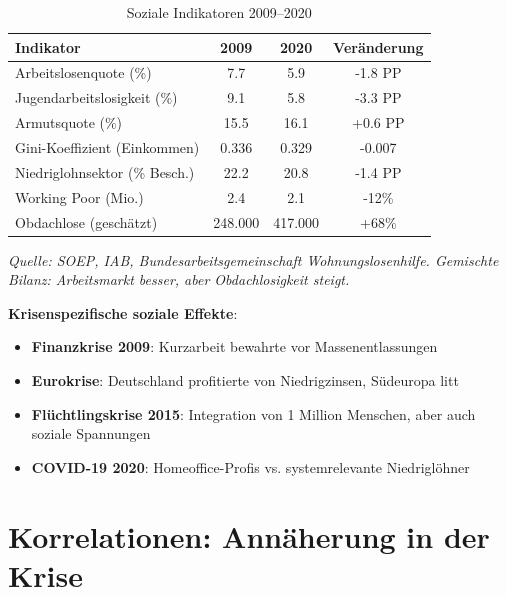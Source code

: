 \begin{table}[ht]
    \centering
    \caption{Soziale Indikatoren 2009–2020}
    \label{tab:sozial_krisen}
    \begin{tabular}{lccc}
        \toprule
        \textbf{Indikator} & \textbf{2009} & \textbf{2020} & \textbf{Veränderung} \\
        \midrule
        Arbeitslosenquote (\%) & 7.7 & 5.9 & -1.8 PP \\
        Jugendarbeitslosigkeit (\%) & 9.1 & 5.8 & -3.3 PP \\
        Armutsquote (\%) & 15.5 & 16.1 & +0.6 PP \\
        Gini-Koeffizient (Einkommen) & 0.336 & 0.329 & -0.007 \\
        Niedriglohnsektor (\% Besch.) & 22.2 & 20.8 & -1.4 PP \\
        Working Poor (Mio.) & 2.4 & 2.1 & -12\% \\
        Obdachlose (geschätzt) & 248.000 & 417.000 & +68\% \\
        \bottomrule
    \end{tabular}
\end{table}

\begin{flushleft}
\footnotesize{\textit{Quelle: SOEP, IAB, Bundesarbeitsgemeinschaft Wohnungslosenhilfe. Gemischte Bilanz: Arbeitsmarkt besser, aber Obdachlosigkeit
steigt.}}
\end{flushleft}

\textbf{Krisenspezifische soziale Effekte}:

\begin{itemize}
    \item \textbf{Finanzkrise 2009}: Kurzarbeit bewahrte vor Massenentlassungen
    \item \textbf{Eurokrise}: Deutschland profitierte von Niedrigzinsen, Südeuropa litt
    \item \textbf{Flüchtlingskrise 2015}: Integration von 1 Million Menschen, aber auch soziale Spannungen
    \item \textbf{COVID-19 2020}: Homeoffice-Profis vs. systemrelevante Niedriglöhner
\end{itemize}

\section{Korrelationen: Annäherung in der Krise}

